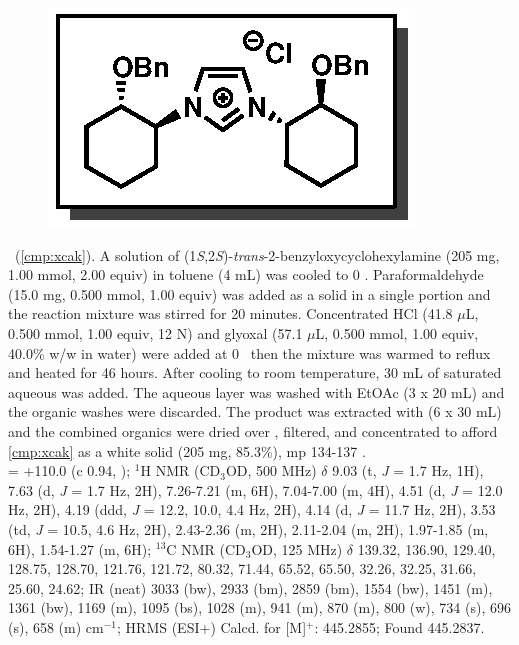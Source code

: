 \vspace{10pt}
\begin{figure}
  \vspace{-18pt}
  \begin{center}
    \includegraphics[scale=0.8]{chp_alkylation/images/xcak}
  \end{center}
  \vspace{-30pt}
\end{figure}
\noindent \textbf{\CMPxcak}\ (\ref{cmp:xcak}). A solution of (1\textit{S},2\textit{S})-\textit{trans}-2-benzyloxycyclohexylamine (205 mg, 1.00 mmol, 2.00 equiv) in toluene (4 mL) was cooled to 0 \degc. Paraformaldehyde (15.0 mg, 0.500 mmol, 1.00 equiv) was added as a
solid in a single portion and the reaction mixture was stirred for 20 minutes. Concentrated HCl
(41.8 $\mu$L, 0.500 mmol, 1.00 equiv, 12 N) and glyoxal (57.1 $\mu$L, 0.500 mmol, 1.00 equiv, 40.0\%
 w/w in water) were added at 0 \degc\  then the mixture was warmed to reflux and heated for 46
 hours.
 After cooling to room temperature, 30 mL of saturated aqueous  was added. The
aqueous layer was washed with EtOAc (3 x 20 mL) and the organic washes were discarded. The
product was extracted with  (6 x 30 mL) and the combined organics were dried over
, filtered, and concentrated to afford \ref{cmp:xcak} as a white solid (205 mg,
85.3\%), mp 134-137 \degc.\\
\rotation = $+$110.0 (c 0.94, );
$^1$H NMR (CD$_3$OD, 500 MHz) $\delta$ 9.03 (t, \textit{J} = 1.7 Hz, 1H), 7.63 (d, \textit{J} =
1.7 Hz, 2H), 7.26-7.21 (m, 6H), 7.04-7.00 (m, 4H), 4.51 (d, \textit{J} = 12.0 Hz, 2H), 4.19 (ddd,
\textit{J} = 12.2, 10.0, 4.4 Hz, 2H), 4.14 (d, \textit{J} = 11.7 Hz, 2H), 3.53 (td, \textit{J} =
10.5, 4.6 Hz, 2H), 2.43-2.36 (m, 2H), 2.11-2.04 (m, 2H), 1.97-1.85 (m, 6H), 1.54-1.27 (m, 6H); $^{13}$C NMR (CD$_3$OD, 125 MHz) $\delta$ 139.32, 136.90, 129.40, 128.75, 128.70, 121.76, 121.72, 80.32, 71.44, 65.52, 65.50, 32.26, 32.25, 31.66, 25.60, 24.62; IR (neat)  3033 (bw), 2933 (bm), 2859 (bm), 1554 (bw), 1451 (m), 1361 (bw), 1169 (m), 1095 (bs), 1028 (m), 941 (m), 870 (m), 800 (w), 734 (s), 696 (s), 658 (m) cm$^{-1}$; HRMS (ESI+) Calcd.
for  [M]$^+$:
445.2855; Found 445.2837.

